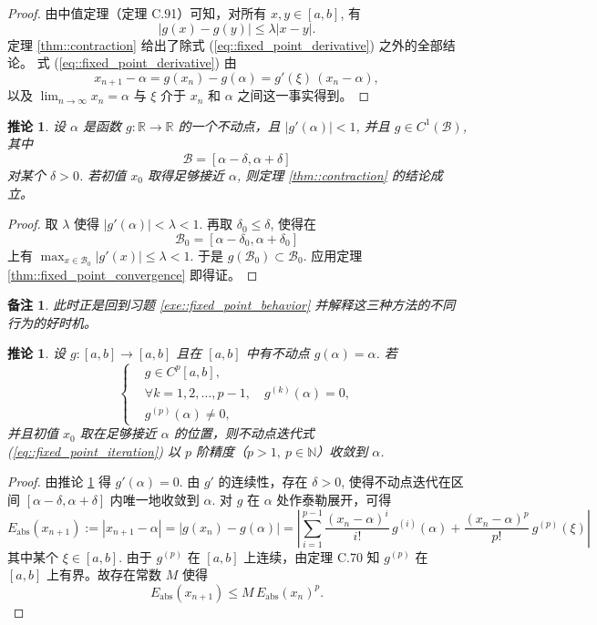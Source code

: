 \documentclass[a4paper]{ctexart}
\newtheorem{remark}{备注}
\newtheorem{corollary}[theorem]{推论}
\numberwithin{theorem}{section}
\numberwithin{equation}{section}
\numberwithin{figure}{section}
\numberwithin{remark}{section}
\begin{document}
\begin{proof}
由中值定理（定理 C.91）可知，对所有 $x,y\in [a,b]$, 有
\[
|g(x)-g(y)|\le \lambda |x-y|.
\]
定理 \ref{thm::contraction} 给出了除式 (\ref{eq::fixed_point_derivative}) 之外的全部结论。
式 (\ref{eq::fixed_point_derivative}) 由
\[
x_{n+1}-\alpha=g(x_n)-g(\alpha)=g'(\xi)\,(x_n-\alpha),
\]
以及 $\lim_{n\to\infty}x_n=\alpha$ 与 $\xi$ 介于 $x_n$ 和 $\alpha$ 之间这一事实得到。
\end{proof}


\begin{corollary}
    \label{cor::fixed_point_derivative_old}
设 $\alpha$ 是函数 $g:\mathbb{R}\to\mathbb{R}$ 的一个不动点，且 $|g'(\alpha)|<1$, 并且 $g\in C^{1}(\mathcal{B})$, 其中
\[
\mathcal{B}=[\alpha-\delta, \alpha+\delta]
\]
对某个 $\delta>0$. 若初值 $x_0$ 取得足够接近 $\alpha$, 则定理 \ref{thm::contraction} 的结论成立。
\end{corollary}

\begin{proof}
取 $\lambda$ 使得 $|g'(\alpha)|<\lambda<1$. 再取 $\delta_0\le \delta$, 使得在
\[
\mathcal{B}_0=[\alpha-\delta_0, \alpha+\delta_0]
\]
上有 $\max_{x\in \mathcal{B}_0}|g'(x)|\le \lambda<1$. 于是 $g(\mathcal{B}_0)\subset \mathcal{B}_0$. 应用定理 \ref{thm::fixed_point_convergence} 即得证。
\end{proof}

\begin{remark}
此时正是回到习题 \ref{exe::fixed_point_behavior} 并解释这三种方法的不同行为的好时机。
\end{remark}


\begin{corollary}
    \label{cor::fixed_point_higher_order_old}
设 $g:[a,b]\to [a,b]$ 且在 $[a,b]$ 中有不动点 $g(\alpha)=\alpha$. 若
\begin{equation}
\left\{
\begin{aligned}
& g\in C^{p}[a,b],\\
& \forall k=1,2,\dots,p-1,\quad g^{(k)}(\alpha)=0,\\
& g^{(p)}(\alpha)\ne 0,
\end{aligned}
\right.
\end{equation}
并且初值 $x_0$ 取在足够接近 $\alpha$ 的位置，则不动点迭代式 (\ref{eq::fixed_point_iteration}) 以 $p$ 阶精度（$p>1,\ p\in\mathbb{N}$）收敛到 $\alpha$.
\end{corollary}

\begin{proof}
由推论 \ref{cor::fixed_point_derivative_old} 得 $g'(\alpha)=0$. 由 $g'$ 的连续性，存在 $\delta>0$, 
使得不动点迭代在区间 $[\alpha-\delta,\alpha+\delta]$ 内唯一地收敛到 $\alpha$. 对 $g$ 在 $\alpha$ 处作泰勒展开，可得
\[
E_{\mathrm{abs}}(x_{n+1}) := |x_{n+1}-\alpha|
=|g(x_n)-g(\alpha)|
=\left|\sum_{i=1}^{p-1}\frac{(x_n-\alpha)^i}{i!}\,g^{(i)}(\alpha)
+\frac{(x_n-\alpha)^p}{p!}\,g^{(p)}(\xi)\right|
\]
其中某个 $\xi\in[a,b]$. 由于 $g^{(p)}$ 在 $[a,b]$ 上连续，由定理 C.70 知 $g^{(p)}$ 在 $[a,b]$ 上有界。故存在常数 $M$ 使得
\[
E_{\mathrm{abs}}(x_{n+1}) \le M\,E_{\mathrm{abs}}(x_n)^p.
\]
\end{proof}
\end{document}
